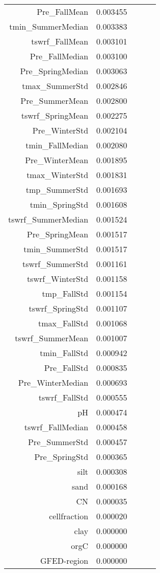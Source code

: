 \begin{table}[h]
\begin{tabular}{rrrrr}
Pre_FallMean & 0.003455 \\
tmin_SummerMedian & 0.003383 \\
tswrf_FallMean & 0.003101 \\
Pre_FallMedian & 0.003100 \\
Pre_SpringMedian & 0.003063 \\
tmax_SummerStd & 0.002846 \\
Pre_SummerMean & 0.002800 \\
tswrf_SpringMean & 0.002275 \\
Pre_WinterStd & 0.002104 \\
tmin_FallMedian & 0.002080 \\
Pre_WinterMean & 0.001895 \\
tmax_WinterStd & 0.001831 \\
tmp_SummerStd & 0.001693 \\
tmin_SpringStd & 0.001608 \\
tswrf_SummerMedian & 0.001524 \\
Pre_SpringMean & 0.001517 \\
tmin_SummerStd & 0.001517 \\
tswrf_SummerStd & 0.001161 \\
tswrf_WinterStd & 0.001158 \\
tmp_FallStd & 0.001154 \\
tswrf_SpringStd & 0.001107 \\
tmax_FallStd & 0.001068 \\
tswrf_SummerMean & 0.001007 \\
tmin_FallStd & 0.000942 \\
Pre_FallStd & 0.000835 \\
Pre_WinterMedian & 0.000693 \\
tswrf_FallStd & 0.000555 \\
pH & 0.000474 \\
tswrf_FallMedian & 0.000458 \\
Pre_SummerStd & 0.000457 \\
Pre_SpringStd & 0.000365 \\
silt & 0.000308 \\
sand & 0.000168 \\
CN & 0.000035 \\
cellfraction & 0.000020 \\
clay & 0.000000 \\
orgC & 0.000000 \\
GFED-region & 0.000000 \\
\bottomrule
\end{tabular}
\end{table}

